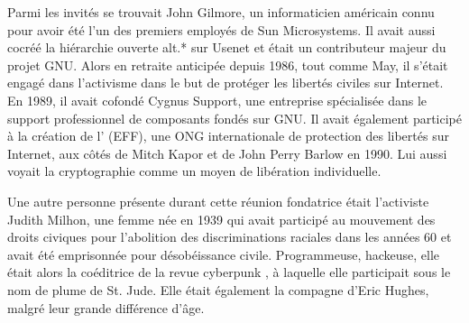 Parmi les invités se trouvait John Gilmore, un informaticien américain connu pour avoir été l'un des premiers employés de Sun Microsystems. Il avait aussi cocréé la hiérarchie ouverte alt.* sur Usenet et était un contributeur majeur du projet GNU. Alors en retraite anticipée depuis 1986, tout comme May, il s'était engagé dans l'activisme dans le but de protéger les libertés civiles sur Internet. En 1989, il avait cofondé Cygnus Support, une entreprise spécialisée dans le support professionnel de composants fondés sur GNU. Il avait également participé à la création de l' (EFF), une ONG internationale de protection des libertés sur Internet, aux côtés de Mitch Kapor et de John Perry Barlow en 1990. Lui aussi voyait la cryptographie comme un moyen de libération individuelle. %

Une autre personne présente durant cette réunion fondatrice était l'activiste Judith Milhon, une femme née en 1939 qui avait participé au mouvement des droits civiques pour l'abolition des discriminations raciales dans les années 60 et avait été emprisonnée pour désobéissance civile. Programmeuse, hackeuse, elle était alors la coéditrice de la revue cyberpunk , à laquelle elle participait sous le nom de plume de St. Jude. Elle était également la compagne d'Eric Hughes, malgré leur grande différence d'âge.

